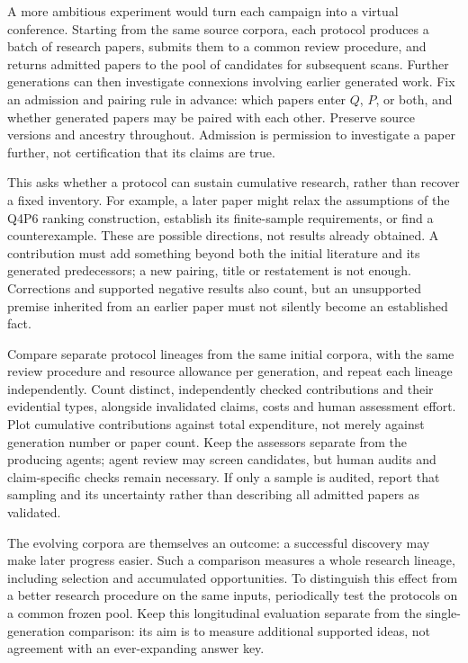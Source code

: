 \documentclass[11pt,a4paper]{article}
\newcommand{\pair}[1]{\mbox{#1}}
\begin{document}
A more ambitious experiment would turn each campaign into a virtual
conference. Starting from the same source corpora, each protocol produces a
batch of research papers, submits them to a common review procedure, and
returns admitted papers to the pool of candidates for subsequent scans.
Further generations can then investigate connexions involving earlier
generated work. Fix an admission and pairing rule in advance: which papers
enter $Q$, $P$, or both, and whether generated papers may be paired with
each other. Preserve source versions and ancestry throughout. Admission is
permission to investigate a paper further, not certification that its claims
are true.

This asks whether a protocol can sustain cumulative research, rather than
recover a fixed inventory. For example, a later paper might relax the
assumptions of the \pair{Q4P6} ranking construction, establish its finite-sample
requirements, or find a counterexample. These are possible directions, not
results already obtained. A contribution must add something beyond both the
initial literature and its generated predecessors; a new pairing, title or
restatement is not enough. Corrections and supported negative results also
count, but an unsupported premise inherited from an earlier paper must not
silently become an established fact.

Compare separate protocol lineages from the same initial corpora, with the
same review procedure and resource allowance per generation, and repeat each
lineage independently. Count distinct, independently checked contributions
and their evidential types, alongside invalidated claims, costs and human
assessment effort. Plot cumulative contributions against total expenditure,
not merely against generation number or paper count. Keep the assessors
separate from the producing agents; agent review may screen candidates, but
human audits and claim-specific checks remain necessary. If only a sample is
audited, report that sampling and its uncertainty rather than describing all
admitted papers as validated.

The evolving corpora are themselves an outcome: a successful discovery may
make later progress easier. Such a comparison measures a whole research
lineage, including selection and accumulated opportunities. To distinguish
this effect from a better research procedure on the same inputs, periodically
test the protocols on a common frozen pool. Keep this longitudinal evaluation
separate from the single-generation comparison: its aim is to measure additional
supported ideas, not agreement with an ever-expanding answer key.


  {}
  {}
\end{document}
